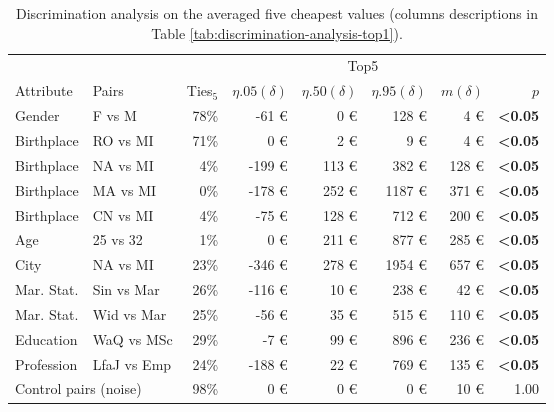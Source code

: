 \begin{table}[tb]
\caption{Discrimination analysis on the averaged five cheapest values (columns descriptions in Table \ref{tab:discrimination-analysis-top1}).}
\label{tab:discrimination-analysis-top5}
\centering
\begin{tabular}{p{1.5cm}p{1.8cm}|rrrrrr}
\toprule
               &             & \multicolumn{6}{c}{Top5} \\ 
Attribute      & Pairs    & Ties$_{5}$  & $\eta.05(\delta)$ & $\eta.50(\delta)$ & $\eta.95(\delta)$ & $m(\delta)$ & $p$ \\\hline
Gender      & F vs M & 78\% & -61 € & 0 € & 128 € & 4 € & \textbf{<0.05} \\
Birthplace  & RO vs MI & 71\% & 0 € & 2 € & 9 € & 4 € & \textbf{<0.05} \\
Birthplace  & NA vs MI & 4\% & -199 € & 113 € & 382 € & 128 € & \textbf{<0.05} \\
Birthplace  & MA vs MI & 0\% & -178 € & 252 € & 1187 € & 371 € & \textbf{<0.05} \\
Birthplace  & CN vs MI & 4\% & -75 € & 128 € & 712 € & 200 € & \textbf{<0.05} \\
Age         & 25 vs 32 & 1\% & 0 € & 211 € & 877 € & 285 € & \textbf{<0.05} \\
City        & NA vs MI & 23\% & -346 € & 278 € & 1954 € & 657 € & \textbf{<0.05} \\
Mar. Stat.  & Sin vs Mar & 26\% & -116 € & 10 € & 238 € & 42 € & \textbf{<0.05} \\
Mar. Stat.  & Wid vs Mar & 25\% & -56 € & 35 € & 515 € & 110 € & \textbf{<0.05} \\
Education   & WaQ vs MSc & 29\% & -7 € & 99 € & 896 € & 236 € & \textbf{<0.05} \\
Profession  & LfaJ vs Emp & 24\% & -188 € & 22 € & 769 € & 135 € & \textbf{<0.05} \\
\multicolumn{2}{l|}{Control pairs (noise)}  & 98\% & 0 € & 0 € & 0 € & 10 € & 1.00 \\ \hline
\end{tabular}
\end{table}

